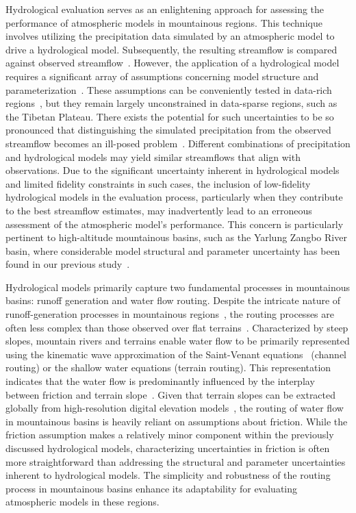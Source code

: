 \documentclass[draft]{agujournal2019}
\begin{document}
Hydrological evaluation serves as an enlightening approach for assessing the performance of atmospheric models in mountainous regions. This technique involves utilizing the precipitation data simulated by an atmospheric model to drive a hydrological model. Subsequently, the resulting streamflow is compared against observed streamflow~\cite{krier2012WRR, henn2015WRR, henn2016WRR, pang2020HESS}. However, the application of a hydrological model requires a significant array of assumptions concerning model structure and parameterization~\cite{kirchner2009WRR, henn2016WRR}. These assumptions can be conveniently tested in data-rich regions~\cite{clark2011WRR, zheng2020JAMES}, but they remain largely unconstrained in data-sparse regions, such as the Tibetan Plateau. There exists the potential for such uncertainties to be so pronounced that distinguishing the simulated precipitation from the observed streamflow becomes an ill-posed problem~\cite{renard2010WRR}. Different combinations of precipitation and hydrological models may yield similar streamflows that align with observations. Due to the significant uncertainty inherent in hydrological models and limited fidelity constraints in such cases, the inclusion of low-fidelity hydrological models in the evaluation process, particularly when they contribute to the best streamflow estimates, may inadvertently lead to an erroneous assessment of the atmospheric model's performance. This concern is particularly pertinent to high-altitude mountainous basins, such as the Yarlung Zangbo River basin, where considerable model structural and parameter uncertainty has been found in our previous study~\cite{lei2025JH}.

Hydrological models primarily capture two fundamental processes in mountainous basins: runoff generation and water flow routing. Despite the intricate nature of runoff-generation processes in mountainous regions~\cite{van_tiel2024NW}, the routing processes are often less complex than those observed over flat terrains~\cite{getirana2013WRR, moussa1996JH}. Characterized by steep slopes, mountain rivers and terrains enable water flow to be primarily represented using the kinematic wave approximation of the Saint-Venant equations~\cite{moussa1996JH} (channel routing) or the shallow water equations (terrain routing). This representation indicates that the water flow is predominantly influenced by the interplay between friction and terrain slope~\cite{getirana2013WRR, moussa1996JH}. Given that terrain slopes can be extracted globally from high-resolution digital elevation models~\cite{yamazaki2017GRL, yamazaki2019WRR}, the routing of water flow in mountainous basins is heavily reliant on assumptions about friction. While the friction assumption makes a relatively minor component within the previously discussed hydrological models, characterizing uncertainties in friction is often more straightforward than addressing the structural and parameter uncertainties inherent to hydrological models. The simplicity and robustness of the routing process in mountainous basins enhance its adaptability for evaluating atmospheric models in these regions.
\end{document}
